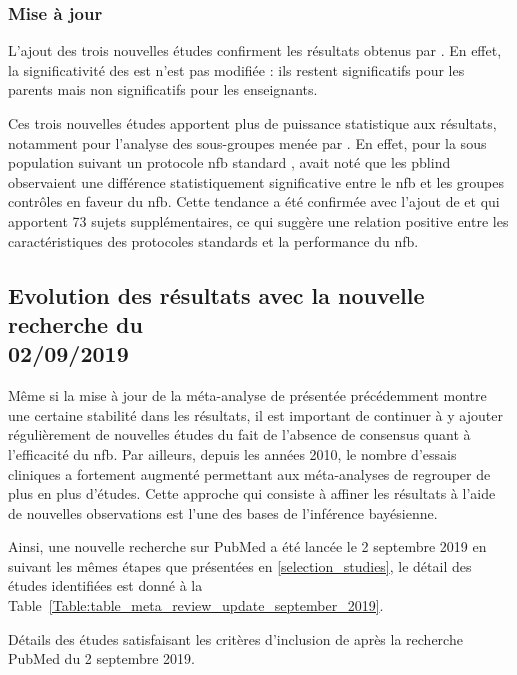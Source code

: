 \subsubsection{Mise à jour}

L'ajout des trois nouvelles études \citep{Baumeister2016, Strehl2017, Bazanova2018} confirment les résultats obtenus par \citep{Cortese2016}. En effet,
la significativité des \gls{est} n'est pas modifiée : ils restent significatifs pour les parents mais non significatifs pour les enseignants. 

Ces trois nouvelles études apportent plus de puissance statistique aux résultats, notamment pour l'analyse des sous-groupes menée par \citet{Cortese2016}.
En effet, pour la sous population suivant un protocole \gls{nfb} standard \citep{Arns2014}, \citet{Cortese2016} avait noté que les \gls{pblind} observaient
une différence statistiquement significative entre le \gls{nfb} et les groupes contrôles en faveur du \gls{nfb}. Cette tendance a été confirmée avec l'ajout 
de \citet{Baumeister2016} et \citet{Strehl2017} qui apportent 73 sujets supplémentaires, ce qui suggère une relation positive entre les caractéristiques des protocoles standards
et la performance du \gls{nfb}. 

\subsection{Evolution des résultats avec la nouvelle recherche du \\ 02/09/2019}

Même si la mise à jour de la méta-analyse de \citet{Cortese2016} présentée précédemment montre une certaine stabilité dans les résultats, il est important de 
continuer à y ajouter régulièrement de nouvelles études du fait de l'absence de consensus quant à l'efficacité du \gls{nfb}. Par ailleurs, depuis les années 2010, 
le nombre d'essais cliniques a fortement augmenté permettant aux méta-analyses de regrouper de plus en plus d'études. Cette approche qui consiste à affiner les 
résultats à l'aide de nouvelles observations est l'une des bases de l'inférence bayésienne.

Ainsi, une nouvelle recherche sur PubMed a été lancée le 2 septembre 2019 en suivant les mêmes étapes que présentées en \ref{selection_studies}, le détail
des études identifiées est donné à la Table~\ref{Table:table_meta_review_update_september_2019}.

\begin{table}[h!]
  \centering
  \caption{Détails des études satisfaisant les critères d'inclusion de \citep{Cortese2016} après la recherche PubMed du 2 septembre 2019.}
  
  \label{Table:table_meta_review_update_september_2019}
\end{table} 

